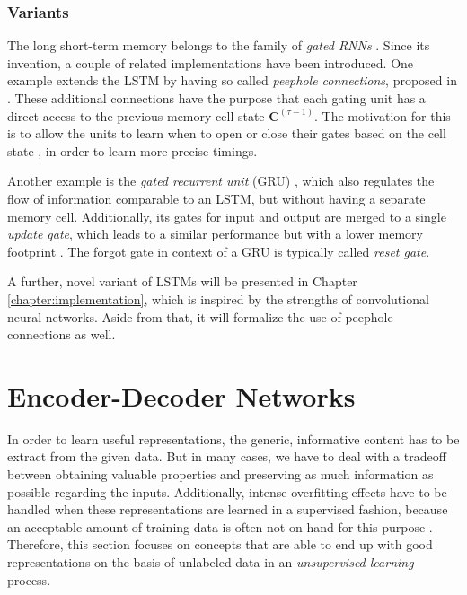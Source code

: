 \subsubsection{Variants}

The long short-term memory belongs to the family of \textit{gated RNNs} \parencite[p. 411]{deep_learning}. Since its invention, a couple of related implementations have been introduced. One example extends the LSTM by having so called \textit{peephole connections}, proposed in \parencite{lstm_peep}. These additional connections have the purpose that each gating unit has a direct access to the previous memory cell state $ \textbf{C}^{(\tau-1)} $. The motivation for this is to allow the units to learn when to open or close their gates based on the cell state \parencite{lstm-space}, in order to learn more precise timings.

Another example is the \textit{gated recurrent unit} (GRU) \parencite{gru}, which also regulates the flow of information comparable to an LSTM, but without having a separate memory cell. Additionally, its gates for input and output are merged to a single \textit{update gate}, which leads to a similar performance but with a lower memory footprint \parencite{gru-video}. The forgot gate in context of a GRU is typically called \textit{reset gate}.

A further, novel variant of LSTMs will be presented in Chapter \ref{chapter:implementation}, which is inspired by the strengths of convolutional neural networks. Aside from that, it will formalize the use of peephole connections as well.


\section{Encoder-Decoder Networks}

In order to learn useful representations, the generic, informative content has to be extract from the given data. But in many cases, we have to deal with a tradeoff between obtaining valuable properties and preserving as much information as possible regarding the inputs. Additionally, intense overfitting effects have to be handled when these representations are learned in a supervised fashion, because an acceptable amount of training data is often not on-hand for this purpose \parencite[p. 527]{deep_learning}. Therefore, this section focuses on concepts that are able to end up with good representations on the basis of unlabeled data in an \textit{unsupervised learning} process. 


